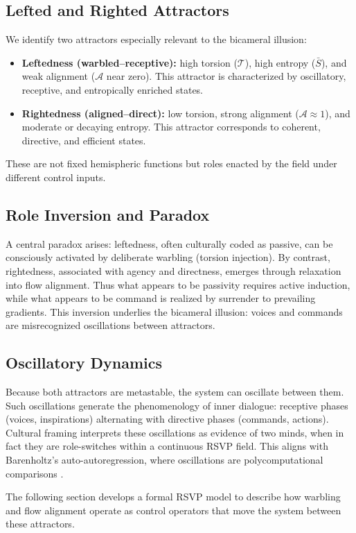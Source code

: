 \documentclass[a4paper,11pt]{article}
\begin{document}
\subsection{Lefted and Righted Attractors}
We identify two attractors especially relevant to the bicameral illusion:
\begin{itemize}
    \item \textbf{Leftedness (warbled--receptive):} high torsion ($\mathcal{T}$), high entropy ($\bar{S}$), and weak alignment ($\mathcal{A}$ near zero). This attractor is characterized by oscillatory, receptive, and entropically enriched states.
    \item \textbf{Rightedness (aligned--direct):} low torsion, strong alignment ($\mathcal{A}\approx 1$), and moderate or decaying entropy. This attractor corresponds to coherent, directive, and efficient states.
\end{itemize}
These are not fixed hemispheric functions but roles enacted by the field under different control inputs.

\subsection{Role Inversion and Paradox}
A central paradox arises: leftedness, often culturally coded as passive, can be consciously activated by deliberate warbling (torsion injection). By contrast, rightedness, associated with agency and directness, emerges through relaxation into flow alignment. Thus what appears to be passivity requires active induction, while what appears to be command is realized by surrender to prevailing gradients. This inversion underlies the bicameral illusion: voices and commands are misrecognized oscillations between attractors.

\subsection{Oscillatory Dynamics}
Because both attractors are metastable, the system can oscillate between them. Such oscillations generate the phenomenology of inner dialogue: receptive phases (voices, inspirations) alternating with directive phases (commands, actions). Cultural framing interprets these oscillations as evidence of two minds, when in fact they are role-switches within a continuous RSVP field. This aligns with Barenholtz's auto-autoregression, where oscillations are polycomputational comparisons \citep{barenholtz2025autoregressive}.

The following section develops a formal RSVP model to describe how warbling and flow alignment operate as control operators that move the system between these attractors.
\end{document}
